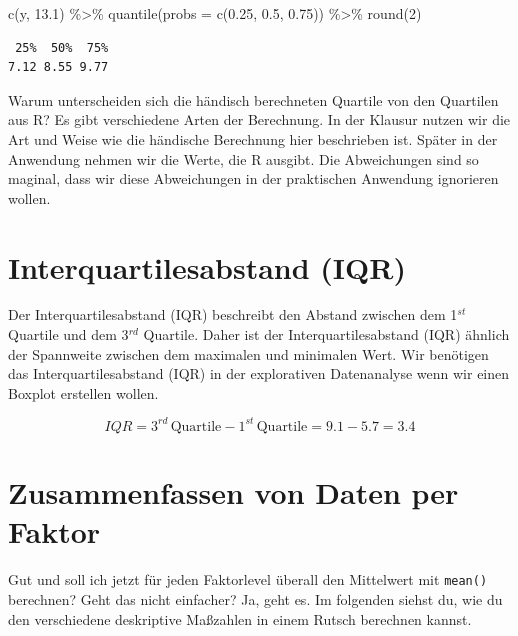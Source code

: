 \documentclass[
  letterpaper,
  DIV=11,
  oneside]{scrreport}
\newenvironment{Shaded}{\begin{snugshade}}{\end{snugshade}}
\newcommand{\AttributeTok}[1]{\textcolor[rgb]{0.40,0.45,0.13}{#1}}
\newcommand{\DecValTok}[1]{\textcolor[rgb]{0.68,0.00,0.00}{#1}}
\newcommand{\FloatTok}[1]{\textcolor[rgb]{0.68,0.00,0.00}{#1}}
\newcommand{\FunctionTok}[1]{\textcolor[rgb]{0.28,0.35,0.67}{#1}}
\newcommand{\NormalTok}[1]{\textcolor[rgb]{0.00,0.23,0.31}{#1}}
\newcommand{\SpecialCharTok}[1]{\textcolor[rgb]{0.37,0.37,0.37}{#1}}
\begin{document}
\begin{Shaded}
\begin{Highlighting}[]
\FunctionTok{c}\NormalTok{(y, }\FloatTok{13.1}\NormalTok{) }\SpecialCharTok{\%\textgreater{}\%} \FunctionTok{quantile}\NormalTok{(}\AttributeTok{probs =} \FunctionTok{c}\NormalTok{(}\FloatTok{0.25}\NormalTok{, }\FloatTok{0.5}\NormalTok{, }\FloatTok{0.75}\NormalTok{)) }\SpecialCharTok{\%\textgreater{}\%} \FunctionTok{round}\NormalTok{(}\DecValTok{2}\NormalTok{) }
\end{Highlighting}
\end{Shaded}

\begin{verbatim}
 25%  50%  75% 
7.12 8.55 9.77 
\end{verbatim}

Warum unterscheiden sich die händisch berechneten Quartile von den
Quartilen aus R? Es gibt verschiedene Arten der Berechnung. In der
Klausur nutzen wir die Art und Weise wie die händische Berechnung hier
beschrieben ist. Später in der Anwendung nehmen wir die Werte, die R
ausgibt. Die Abweichungen sind so maginal, dass wir diese Abweichungen
in der praktischen Anwendung ignorieren wollen.

\hypertarget{interquartilesabstand-iqr}{%
\section{Interquartilesabstand (IQR)}\label{interquartilesabstand-iqr}}

Der Interquartilesabstand (IQR) beschreibt den Abstand zwischen dem
1\(^{st}\) Quartile und dem 3\(^{rd}\) Quartile. Daher ist der
Interquartilesabstand (IQR) ähnlich der Spannweite zwischen dem
maximalen und minimalen Wert. Wir benötigen das Interquartilesabstand
(IQR) in der explorativen Datenanalyse wenn wir einen Boxplot erstellen
wollen.

\[
IQR = 3^{rd}\,\mbox{Quartile} - 1^{st}\,\mbox{Quartile} = 9.1 - 5.7 = 3.4
\]

\hypertarget{sec-desc-group-by}{%
\section{Zusammenfassen von Daten per Faktor}\label{sec-desc-group-by}}

Gut und soll ich jetzt für jeden Faktorlevel überall den Mittelwert mit
\texttt{mean()} berechnen? Geht das nicht einfacher? Ja, geht es. Im
folgenden siehst du, wie du den verschiedene deskriptive Maßzahlen in
einem Rutsch berechnen kannst.
\end{document}
